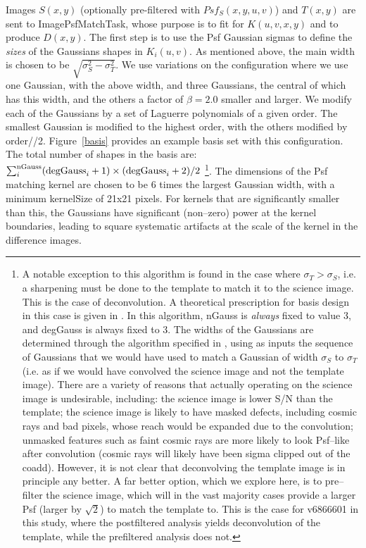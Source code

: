 \documentclass[prd, nofootinbib, floatfix, 11pt,tightenlines,times]{article}
\begin{document}
Images $S(x,y)$ (optionally pre-filtered with $Psf_S(x,y,u,v)$) and
$T(x,y)$ are sent to ImagePsfMatchTask, whose purpose is to fit for
$K(u,v,x,y)$ and to produce $D(x,y)$.  The first step is to use the
Psf Gaussian sigmas to define the {\it sizes} of the Gaussians shapes
in $K_i(u,v)$.  As mentioned above, the main width is chosen to be
$\sqrt{\sigma_S^2 - \sigma_T^2}$.  We use variations on the
configuration where we use one Gaussian, with the above width, and
three Gaussians, the central of which has this width, and the others a
factor of $\beta = 2.0$ smaller and larger.  We modify each of the
Gaussians by a set of Laguerre polynomials of a given order.  The
smallest Gaussian is modified to the highest order, with the others
modified by order//2.  Figure~\ref{basis} provides an example basis
set with this configuration.  The total number of shapes in the basis
are: $\sum_i^{\rm nGauss} ({\rm degGauss}_i+1)\times({\rm
  degGauss}_i+2)/2$ \footnote{ A notable exception to this algorithm
  is found in the case where $\sigma_T > \sigma_S$, i.e. a sharpening
  must be done to the template to match it to the science image.  This
  is the case of deconvolution.  A theoretical prescription for basis
  design in this case is given in \cite{0266-5611-26-8-085002}.  In
  this algorithm, nGauss is {\it always} fixed to value 3, and
  degGauss is always fixed to 3.  The widths of the Gaussians are
  determined through the algorithm specified in
  \cite{0266-5611-26-8-085002}, using as inputs the sequence of
  Gaussians that we would have used to match a Gaussian of width
  $\sigma_S$ to $\sigma_T$ (i.e. as if we would have convolved the
  science image and not the template image).  There are a variety of
  reasons that actually operating on the science image is undesirable,
  including: the science image is lower S/N than the template; the
  science image is likely to have masked defects, including cosmic
  rays and bad pixels, whose reach would be expanded due to the
  convolution; unmasked features such as faint cosmic rays are more
  likely to look Psf--like after convolution (cosmic rays will likely
  have been sigma clipped out of the coadd).  However, it is not clear
  that deconvolving the template image is in principle any better.  A
  far better option, which we explore here, is to pre--filter the
  science image, which will in the vast majority cases provide a
  larger Psf (larger by $\sqrt{2}$) to match the template to.  This is
  the case for v6866601 in this study, where the postfiltered analysis
  yields deconvolution of the template, while the prefiltered analysis
  does not.
}.
%
The dimensions of the Psf matching kernel are
chosen to be 6 times the largest Gaussian width, with a minimum
kernelSize of 21x21 pixels.  For kernels that are significantly
smaller than this, the Gaussians have significant (non--zero) power at
the kernel boundaries, leading to square systematic artifacts at the
scale of the kernel in the difference images.
\end{document}
